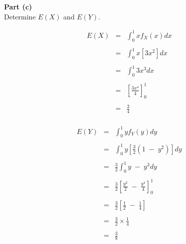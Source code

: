 \documentclass[a4paper,12pt]{article}
\begin{document}
	\newpage
	\begin{framed}
		\large 
		\noindent \textbf{Part (c)}\\
		\noindent Determine $E(X)$ and $E(Y)$.
	\end{framed}
	
		
		\begin{eqnarray*}
			E ( X ) &=&  \int^{1}_{0} x f_{X}(x) dx \\ 
			& & \\
			&=&  \int^{1}_{0} x \left[ 3x^2 \right] dx \\
			& & \\
			&=&  \int^{1}_{0}   3x^3  dx \\
			& & \\
			&=& \left[ \frac{3x^4}{4} \right]^{1}_{0}\\
			& & \\
			&=& \frac{3}{4} \\
		\end{eqnarray*}
	
	\begin{eqnarray*}
		E ( Y ) &=&  \int^{1}_{0} y f_{Y}(y) dy \\ 
		& & \\
		&=&  \int^{1}_{0} y \left[ \frac{3}{2}(1 \;-\; y^2) \right] dy \\
		& & \\
		&=&   \frac{3}{2} \int^{1}_{0} y \;-\; y^3 dy \\
		& & \\
		&=&   \frac{3}{2} \left[ \frac{y^2}{2} \;-\; \frac{y^4}{4} \right]^{1}_{0}  \\
		& & \\
		&=&   \frac{3}{2} \left[ \frac{1}{2} \;-\; \frac{1}{4} \right]  \\
		& & \\
		&=& \frac{3}{2} \times \frac{1}{4} \\
		& & \\
		&=& \frac{3}{8}\\
	\end{eqnarray*}
	
\end{document}
